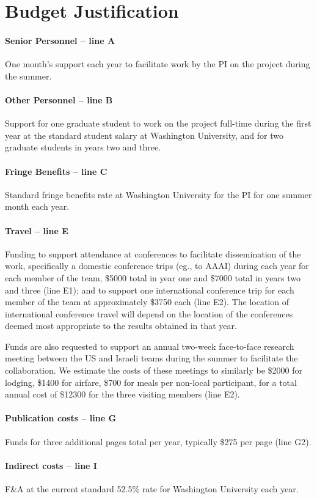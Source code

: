 \documentclass[12pt]{article}
\begin{document}
\section*{Budget Justification}
\paragraph{Senior Personnel -- line A}
One month's support each year to facilitate work by the PI on the project during
the summer.

\paragraph{Other Personnel -- line B}
Support for one graduate student to work on the project full-time during the first year at the standard student salary at Washington  University, and for two graduate students in years two and three.

\paragraph{Fringe Benefits -- line C}
Standard fringe benefits rate at Washington University for the PI for one
summer month each year.

\paragraph{Travel -- line E}
Funding to support attendance at conferences to facilitate dissemination of the
work, specifically a domestic conference trips (eg., to AAAI) during each year for each member of the team, \$5000 total in year one and \$7000 total in years two and three (line E1); and to support one international conference trip for each member of the team at approximately \$3750 each (line E2). The location of international conference travel will depend on the location of the conferences deemed most appropriate to the results obtained in that year.

Funds are also requested to support an annual two-week face-to-face research meeting between the US and Israeli teams during the summer to facilitate the collaboration. We estimate the costs of these meetings to similarly be \$2000 for lodging, \$1400 for airfare, \$700 for meals per non-local participant, for a total annual cost of \$12300 for the three visiting members (line E2).

\paragraph{Publication costs -- line G}
Funds for three additional pages total per year, typically \$275 per page (line G2).

\paragraph{Indirect costs -- line I}
F\&A at the current standard 52.5\% rate for Washington University each year.
\end{document}
